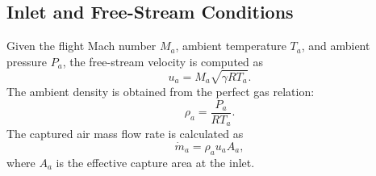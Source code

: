 \documentclass[preprint,12pt]{elsarticle}
\begin{document}
\subsection{Inlet and Free-Stream Conditions}
Given the flight Mach number $M_a$, ambient temperature $T_a$, and ambient pressure $P_a$, the free-stream velocity is computed as
\begin{equation}
u_a = M_a \sqrt{\gamma R T_a}.
\end{equation}
The ambient density is obtained from the perfect gas relation:
\begin{equation}
\rho_a = \frac{P_a}{R T_a}.
\end{equation}
The captured air mass flow rate is calculated as
\begin{equation}
\dot{m}_a = \rho_a u_a A_a,
\end{equation}
where $A_a$ is the effective capture area at the inlet.
\end{document}

